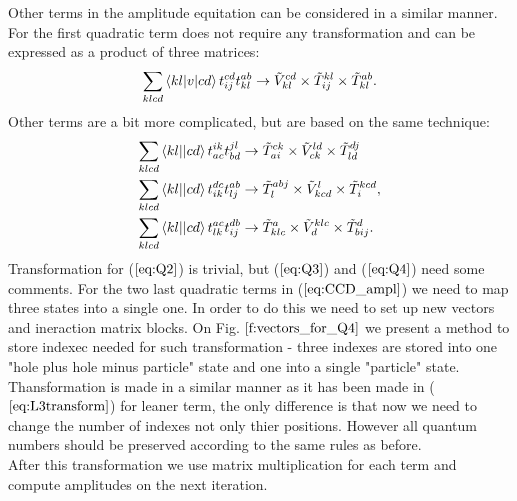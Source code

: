 \documentclass[twoside,english]{uiofysmaster}
\theoremstyle{definition}
\begin{document}
Other terms in the amplitude equitation can be considered in a similar manner. For the first quadratic term does not require any transformation and can be expressed as a product of three matrices:
\begin{equation}
\sum_{klcd}\braket{kl|v|cd}t_{ij}^{cd} t_{kl}^{ab} \rightarrow \tilde{V}_{kl}^{cd} \times \tilde{T}_{ij}^{kl} \times \tilde{T}_{kl}^{ab }. 
\end{equation}
Other terms are a bit more complicated, but are based on the same technique:
\begin{align}
\sum_{klcd}\braket{kl||cd}t_{ac}^{ik} t_{bd}^{jl}   &\rightarrow  \tilde{T}_{ai}^{ck}\times\tilde{V}_{ck}^{ld}\times\tilde{T}_{ld}^{dj} \label{eq:Q2} \\ 
\sum_{klcd}\braket{kl||cd}t_{ik}^{dc}t_{lj}^{ab} &\rightarrow     \tilde{T}_{l}^{abj}\times \tilde{V}_{kcd}^{l} \times  \tilde{T}_{i}^{kcd}, \label{eq:Q3} \\ 
\sum_{klcd}\braket{kl||cd}t_{lk}^{ac}t_{ij}^{db} &\rightarrow \tilde{T}_{klc}^{a} \times  \tilde{V}_{d}^{klc}\times \tilde{T}_{bij}^{d}. \label{eq:Q4}
\end{align}
Transformation for ($\ref{eq:Q2}$) is trivial, but ($\ref{eq:Q3}$) and ($\ref{eq:Q4}$) need some comments. For the two last quadratic terms in ($\ref{eq:CCD_ampl}$) we need to map three states into a single one. In order to do this we need to set up new vectors and ineraction matrix blocks. On Fig. $\ref{f:vectors_for_Q4}$ we present a method to store indexec needed for such transformation - three indexes are stored into one "hole plus hole minus particle" state and one into a single "particle" state. Thansformation is made in a similar manner as it has been made in  ($\ref{eq:L3transform}$) for leaner term, the only difference is that now we need to change the number of indexes not only thier positions. However all quantum numbers should be preserved according to the same rules as before.\\
After this transformation we use matrix multiplication for each term and compute amplitudes on the next iteration. 
\end{document}
